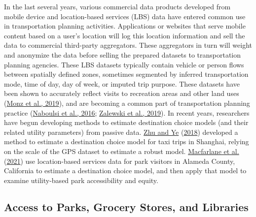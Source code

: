 \documentclass[3p, authoryear, review]{elsarticle} %
\begin{document}
In the last several years, various commercial data products developed from
mobile device and location-based services (LBS) data have entered common use in
transportation planning activities. Applications or websites that serve mobile
content based on a user's location will log this location information and
sell the data to commercial third-party aggregators. These aggregators in turn will weight
and anonymize the data before selling the prepared datasets to transportation
planning agencies. These LBS datasets typically contain
vehicle or person flows between spatially defined zones, sometimes segmented by
inferred transportation mode, time of day, day of week, or imputed trip purpose.
These datasets have been shown to accurately reflect visits to recreation areas
and other land uses (\protect\hyperlink{ref-monz2019}{Monz et al., 2019}), and are becoming a common part of transportation
planning practice (\protect\hyperlink{ref-naboulsi2016}{Naboulsi et al., 2016}; \protect\hyperlink{ref-tcrp138}{Zalewski et al., 2019}). In recent years, researchers have
begun developing methods to estimate destination choice models (and their
related utility parameters) from passive data. \protect\hyperlink{ref-zhu2018}{Zhu and Ye} (\protect\hyperlink{ref-zhu2018}{2018}) developed a method to
estimate a destination choice model for taxi trips in Shanghai, relying on the
scale of the GPS dataset to estimate a robust model. \protect\hyperlink{ref-alamedaparks}{Macfarlane et al.} (\protect\hyperlink{ref-alamedaparks}{2021}) use
location-based services data for park visitors in Alameda County, California to
estimate a destination choice model, and then apply that model to examine
utility-based park accessibility and equity.

\hypertarget{access-to-parks-grocery-stores-and-libraries}{%
\subsection{Access to Parks, Grocery Stores, and Libraries}\label{access-to-parks-grocery-stores-and-libraries}}
\end{document}

